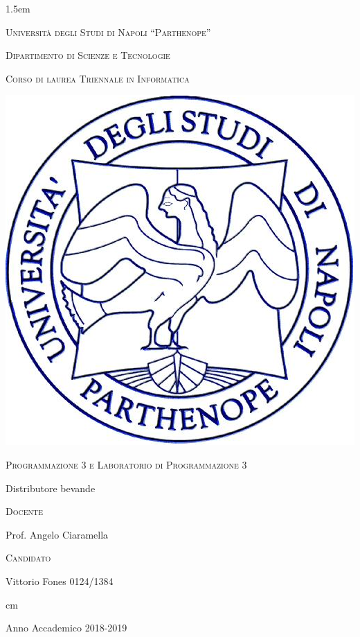 \documentclass[12pt,italian,a4paper,oneside,openright]{book}
\begin{document}

\baselineskip 1.5em

{ \thispagestyle{empty}

\vskip 1cm \large \centerline{\textsc{Universit\`a degli Studi di
Napoli ``Parthenope''}}

\centerline {\textsc{Dipartimento di Scienze e Tecnologie}}

\centerline {\small\textsc{Corso di laurea Triennale in Informatica}}

\begin{center}
\includegraphics[scale=0.5]{logo_parthenope.png}
\end{center}

\vskip 0.5cm

\large \centerline {\textsc{Programmazione 3 e Laboratorio di Programmazione 3}}

\vskip 0.5cm

\Large \centerline {Distributore bevande}


\vskip 4.5cm


\large
\begin{minipage}[t]{7cm}
\textsc{Docente}

Prof. Angelo Ciaramella

\end{minipage}
\hfill
\begin{minipage}[t]{6cm}
\hfill \textsc{Candidato}

\hfill Vittorio Fones 0124/1384
\end{minipage}

 cm \Large \centerline {Anno Accademico 2018-2019}
\vfill \eject}
\end{document}

